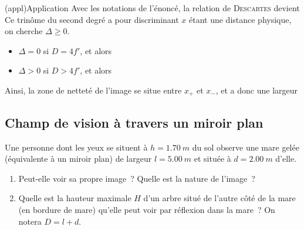 \documentclass[../../main/main.tex]{subfiles}
\begin{document}
\begin{tcn}[sidebyside](appl){Application}
	Avec les notations de l'énoncé, la relation de \textsc{Descartes} devient
	Ce trinôme du second degré a pour discriminant
	\psw{%
		\[
			\boxed{\Delta = D^2-4f'D = D(D-4f')}
		\]
	}%
	\tcblower
	$x$ étant une distance physique, on cherche $\Delta \geq 0$.
	\begin{itemize}[label=$\diamond$, leftmargin=10pt]
		\item $\Delta = 0$ si $D = 4f'$, et alors
		      \psw{%
			      \[
				      \boxed{x = \frac{D}{2}}
			      \]
		      }%
		      \vspace{-20pt}
		\item $\Delta > 0$ si $D > 4f'$, et alors
		      \psw{%
			      \[
				      \boxed{x_\pm = \frac{D\pm\sqrt{D(D-4f')}}{2}}
			      \]
		      }%
		      \vspace{-20pt}
	\end{itemize}
	Ainsi, la zone de netteté de l'image se situe entre $x_+$ et $x_-$, et a
	donc une largeur
	\psw{%
		\[
			\boxed{d = x_+ - x_- = \sqrt{D(D-4f')}}
		\]
	}%
	\vspace{-20pt}
\end{tcn}

\subsection{Champ de vision à travers un miroir plan}
Une personne dont les yeux se situent à $h = \SI{1.70}{m}$ du sol observe une
mare gelée (équivalente à un miroir plan) de largeur $l = \SI{5.00}{m}$ et
située à $d = \SI{2.00}{m}$ d'elle.
\begin{enumerate}
	\item Peut-elle voir sa propre image~? Quelle est la nature de l'image~?
	\item Quelle est la hauteur maximale $H$ d'un arbre situé de l'autre côté de
	      la mare (en bordure de mare) qu'elle peut voir par réflexion dans la
	      mare~? On notera $D = l+d$.
\end{enumerate}
\end{document}
